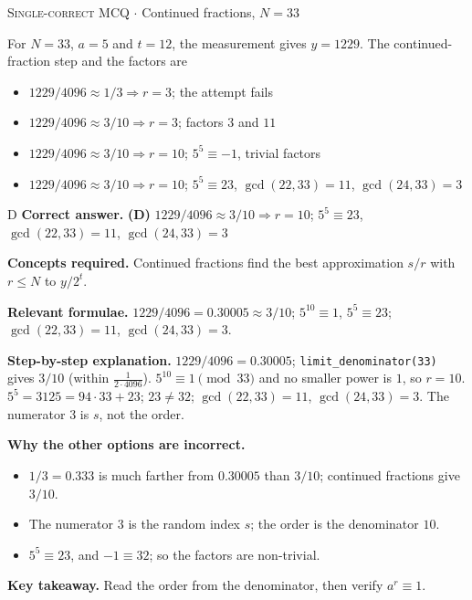 \documentclass[11pt,a4paper]{article}
\newcommand{\optlabel}[1]{\textbf{(#1)}}
\newcommand{\correctlabel}[1]{\textcolor{okgreen}{\textbf{(#1)}\,\ding{51}}}
\newenvironment{qitem}[1]{\begin{list}{}{\setlength{\leftmargin}{3.3em}\setlength{\labelwidth}{3.1em}%
  \setlength{\labelsep}{0.2em}\setlength{\topsep}{3pt}\setlength{\parsep}{3pt}}\item[\textbf{Q.#1}\hfill]}{\end{list}}
\newcommand{\qsep}{\par\vspace{2pt}{\color{black!15}\hrule}\vspace{4pt}}
\newcommand{\qmeta}[2]{{\footnotesize\color{black!60}\textsc{#1} \;$\cdot$\; #2}\par}
\begin{document}
\begin{qitem}{48}
\qmeta{Single-correct MCQ}{Continued fractions, $N = 33$}
For $N = 33$, $a = 5$ and $t = 12$, the measurement gives $y = 1229$. The continued-fraction step and the factors are
\begin{itemize}[leftmargin=2.6em, labelsep=0.4em, itemsep=2pt, topsep=3pt]
\item[\optlabel{A}] $1229/4096 \approx 1/3 \Rightarrow r = 3$; the attempt fails
\item[\optlabel{B}] $1229/4096 \approx 3/10 \Rightarrow r = 3$; factors $3$ and $11$
\item[\optlabel{C}] $1229/4096 \approx 3/10 \Rightarrow r = 10$; $5^5 \equiv -1$, trivial factors
\item[\correctlabel{D}] $1229/4096 \approx 3/10 \Rightarrow r = 10$; $5^5 \equiv 23$, $\gcd(22, 33) = 11$, $\gcd(24, 33) = 3$
\end{itemize}
\end{qitem}
\begin{solbox}{D}
\textbf{\color{brand}Correct answer.} \textcolor{okgreen}{\textbf{(D)}} $1229/4096 \approx 3/10 \Rightarrow r = 10$; $5^5 \equiv 23$, $\gcd(22, 33) = 11$, $\gcd(24, 33) = 3$

\textbf{\color{brand}Concepts required.} Continued fractions find the best approximation $s/r$ with $r \le N$ to $y/2^t$.

\textbf{\color{brand}Relevant formulae.} $1229/4096 = 0.30005 \approx 3/10$; $5^{10} \equiv 1$, $5^5 \equiv 23$; $\gcd(22, 33) = 11$, $\gcd(24, 33) = 3$.

\textbf{\color{brand}Step-by-step explanation.} $1229/4096 = 0.30005$; \texttt{limit\_denominator(33)} gives $3/10$ (within $\frac{1}{2\cdot4096}$). $5^{10} \equiv 1 \pmod{33}$ and no smaller power is $1$, so $r = 10$.
$5^5 = 3125 = 94\cdot33 + 23$; $23 \ne 32$; $\gcd(22, 33) = 11$, $\gcd(24, 33) = 3$. The numerator $3$ is $s$, not the order.

\textbf{\color{brand}Why the other options are incorrect.}
\begin{itemize}[leftmargin=2.4em, itemsep=1pt, topsep=2pt]
\item[\textbf{(A)}] $1/3 = 0.333$ is much farther from $0.30005$ than $3/10$; continued fractions give $3/10$.
\item[\textbf{(B)}] The numerator $3$ is the random index $s$; the order is the denominator $10$.
\item[\textbf{(C)}] $5^5 \equiv 23$, and $-1 \equiv 32$; so the factors are non-trivial.
\end{itemize}
\textbf{\color{brand}Key takeaway.} Read the order from the denominator, then verify $a^r \equiv 1$.
\end{solbox}
\qsep
\end{document}
